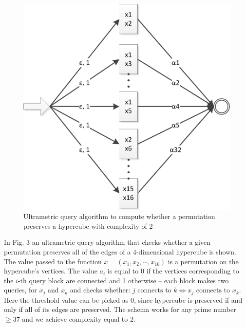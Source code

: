 \documentclass{llncs}
\begin{document}
\begin{figure}
	\centering
	\includegraphics{hypercube_2block.png}
	\caption{Ultrametric query algorithm to compute whether a permutation preserves a hypercube with complexity of 2}
	  \label{hyper2}
\end{figure}

In Fig. 3 an ultrametric query algorithm that checks whether a given permutation preserves all of the edges of a 4-dimensional hypercube is shown. The value passed to the function $x = (x_1, x_2, \cdots, x_{16})$ is a permutation on the hypercube's vertices. The value $a_i$ is equal to 0 if the vertices corresponding to the $i$-th query block are connected and 1 otherwise -- each block makes two queries, for $x_j$ and $x_k$ and checks whether: $j \text{ connects to } k \Leftrightarrow x_j \text{ connects to } x_k$. Here the threshold value can be picked as 0, since hypercube is preserved if and only if all of its edges are preserved. The schema works for any prime number $\geq 37$ and we achieve complexity equal to 2.
\end{document}

